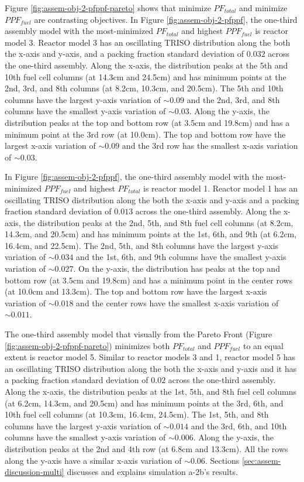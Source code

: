 Figure \ref{fig:assem-obj-2-pfppf-pareto} shows that minimize $PF_{total}$ and 
minimize $PPF_{fuel}$ are contrasting objectives. 
In Figure \ref{fig:assem-obj-2-pfppf}, the one-third assembly model with 
the most-minimized $PF_{total}$ and highest $PPF_{fuel}$ is reactor model 3. 
Reactor model 3 has an oscillating TRISO distribution along the both the 
x-axis and y-axis, and a packing fraction standard deviation of $0.032$ across the 
one-third assembly. 
Along the x-axis, the distribution peaks at the 5th and 10th fuel cell columns 
(at 14.3cm and 24.5cm) and has minimum points at the 2nd, 3rd, and 8th columns 
(at 8.2cm, 10.3cm, and 20.5cm).
The 5th and 10th columns have the largest y-axis variation of $\sim0.09$ and the 
2nd, 3rd, and 8th columns have the smallest y-axis variation of $\sim0.03$.
Along the y-axis, the distribution peaks at the top and bottom row (at 3.5cm and 
19.8cm) and has a minimum point at the 3rd row (at 10.0cm). 
The top and bottom row have the largest x-axis variation of $\sim0.09$ and the 3rd row 
has the smallest x-axis variation of $\sim0.03$. 

In Figure \ref{fig:assem-obj-2-pfppf}, the one-third assembly model with 
the most-minimized $PPF_{fuel}$ and highest $PF_{total}$ is reactor model 1.
Reactor model 1 has an oscillating TRISO distribution along the both the 
x-axis and y-axis and a packing fraction standard deviation of $0.013$ across the 
one-third assembly.
Along the x-axis, the distribution peaks at the 2nd, 5th, and 8th fuel cell columns (at 
8.2cm, 14.3cm, and 20.5cm) and has minimum points at the 1st, 6th, and 9th (at 6.2cm, 
16.4cm, and 22.5cm).
The 2nd, 5th, and 8th columns have the largest y-axis variation of $\sim0.034$ and the 
1st, 6th, and 9th columns have the smallest y-axis variation of $\sim0.027$.
On the y-axis, the distribution has peaks at the top and bottom row (at 3.5cm and 
19.8cm) and has a minimum point in the center rows (at 10.0cm and 13.3cm).
The top and bottom row have the largest x-axis variation of $\sim0.018$ and the 
center rows have the smallest x-axis variation of $\sim0.011$. 

The one-third assembly model that visually from the Pareto Front (Figure 
\ref{fig:assem-obj-2-pfppf-pareto}) minimizes both $PF_{total}$ and $PPF_{fuel}$ 
to an equal extent is reactor model 5. 
Similar to reactor models 3 and 1, reactor model 5 has an oscillating TRISO distribution 
along the both the x-axis and y-axis and it has a packing fraction standard deviation 
of $0.02$ across the one-third assembly.
Along the x-axis, the distribution peaks at the 1st, 5th, and 8th fuel cell columns 
(at 6.2cm, 14.3cm, and 20.5cm) and has minimum points at the 3rd, 6th, and 10th fuel 
cell columns (at 10.3cm, 16.4cm, 24.5cm). 
The 1st, 5th, and 8th columns have the largest y-axis variation of $\sim0.014$ and the 
3rd, 6th, and 10th columns have the smallest y-axis variation of $\sim0.006$.
Along the y-axis, the distribution peaks at the 2nd and 4th row (at 6.8cm and 13.3cm). 
All the rows along the y-axis have a similar x-axis variation of $\sim0.06$.
Sections \ref{sec:assem-discussion-multi} discusses and explains simulation a-2b's 
results.

